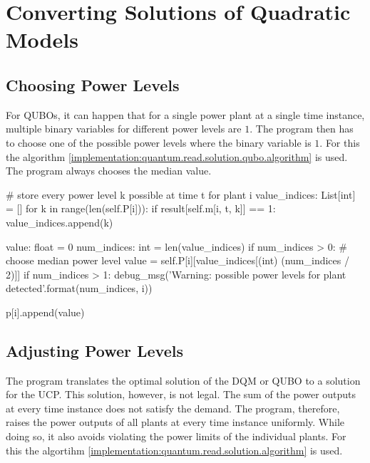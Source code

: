 \section{Converting Solutions of Quadratic Models}

\subsection{Choosing Power Levels}
\label{implementation:quantum.read.solution.qubo}

For QUBOs, it can happen that for a single power plant at a single time instance, multiple binary variables for different power levels are $1$.
The program then has to choose one of the possible power levels where the binary variable is $1$.
For this the algorithm \ref{implementation:quantum.read.solution.qubo.algorithm} is used.
The program always chooses the median value.

\begin{python}[
  float,
  caption={Choosing Power Levels from the QUBO},
  label={implementation:quantum.read.solution.qubo.algorithm}
]
# store every power level k possible at time t for plant i
value_indices: List[int] = []
for k in range(len(self.P[i])):
  if result[self.m[i, t, k]] == 1:
    value_indices.append(k)

value: float = 0
num_indices: int = len(value_indices)
if num_indices > 0:
  # choose median power level
  value = self.P[i][value_indices[(int) (num_indices / 2)]]
  if num_indices > 1:
    debug_msg('Warning: {} possible power levels for plant {} detected'.format(num_indices, i))

p[i].append(value)
\end{python}

\subsection{Adjusting Power Levels}
\label{implementation:quantum.read.solution}

The program translates the optimal solution of the DQM or QUBO to a solution for the UCP.
This solution, however, is not legal.
The sum of the power outputs at every time instance does not satisfy the demand.
The program, therefore, raises the power outputs of all plants at every time instance uniformly.
While doing so, it also avoids violating the power limits of the individual plants.
For this the algortihm \ref{implementation:quantum.read.solution.algorithm} is used.

